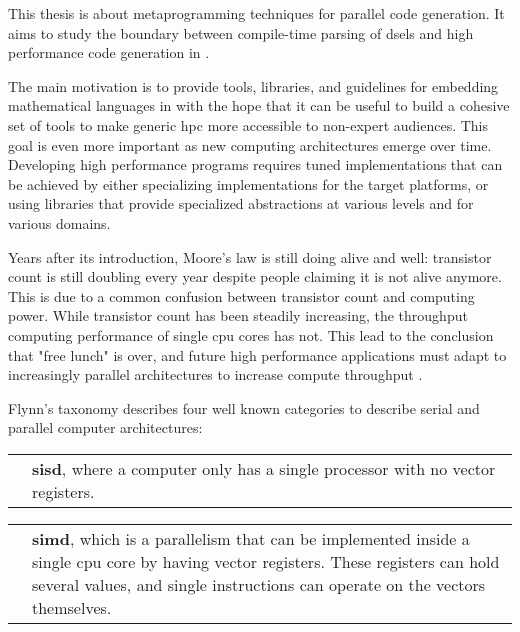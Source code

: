 \documentclass[main]{subfiles}
\begin{document}
This thesis is about metaprogramming techniques for parallel code generation.
It aims to study the boundary between compile-time parsing of
\glspl{dsel} and high performance code generation in \cpp.

The main motivation is to provide tools, libraries, and guidelines for embedding
mathematical languages in \cpp with the hope that it can be useful to build a
cohesive set of tools to make generic \gls{hpc} more accessible
to non-expert audiences. This goal is even more important as new computing
architectures emerge over time. Developing high performance programs requires
tuned implementations that can be achieved by either specializing
implementations for the target platforms, or using libraries that provide
specialized abstractions at various levels and for various domains.

Years after its introduction, Moore's law is still doing alive and well:
transistor count is still doubling every year despite people claiming
it is not alive anymore. This is due to a common confusion between
transistor count and computing power. While transistor count has been steadily
increasing, the throughput computing performance of single \gls{cpu} cores
has not.
This lead to the conclusion that "free lunch" is over, and future
high performance applications must adapt to increasingly parallel architectures
to increase compute throughput
\cite{concurrency-revolution, doi:10.1142/S0129626404001829}.

Flynn's taxonomy \cite{flynn-taxonomy} describes four well known categories
to describe serial and parallel computer architectures\footnotemark{}:


\begin{center}
\begin{tabular}{ p{} p{} }

\raisebox{-.925\height}{}
&
\textbf{\gls{sisd}}, where a computer only has a single processor with no
vector registers.

\end{tabular}
\end{center}

\begin{center}
\begin{tabular}{ p{} p{} }

\raisebox{-.925\height}{}
&
\textbf{\gls{simd}}, which is a parallelism that can be implemented inside
a single \gls{cpu} core by having vector registers. These registers can hold
several values, and single instructions can operate on the vectors themselves.

\end{tabular}
\end{center}
\end{document}

